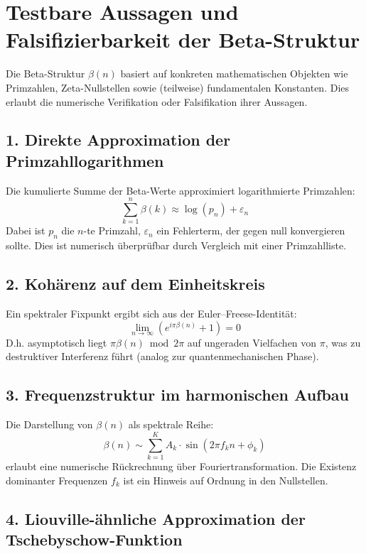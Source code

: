 \section{Testbare Aussagen und Falsifizierbarkeit der Beta-Struktur}

Die Beta-Struktur $\beta(n)$ basiert auf konkreten mathematischen Objekten wie Primzahlen, Zeta-Nullstellen sowie (teilweise) fundamentalen Konstanten. Dies erlaubt die numerische Verifikation oder Falsifikation ihrer Aussagen.

\subsection*{1. Direkte Approximation der Primzahllogarithmen}

Die kumulierte Summe der Beta-Werte approximiert logarithmierte Primzahlen:
\[
\sum_{k=1}^{n} \beta(k) \approx \log(p_n) + \varepsilon_n
\]
Dabei ist $p_n$ die $n$-te Primzahl, $\varepsilon_n$ ein Fehlerterm, der gegen null konvergieren sollte. Dies ist numerisch überprüfbar durch Vergleich mit einer Primzahlliste.

\subsection*{2. Kohärenz auf dem Einheitskreis}

Ein spektraler Fixpunkt ergibt sich aus der Euler–Freese-Identität:
\[
\lim_{n \to \infty} \left(e^{i \pi \beta(n)} + 1\right) = 0
\]
D.h. asymptotisch liegt $\pi \beta(n) \bmod 2\pi$ auf ungeraden Vielfachen von $\pi$, was zu destruktiver Interferenz führt (analog zur quantenmechanischen Phase).

\subsection*{3. Frequenzstruktur im harmonischen Aufbau}

Die Darstellung von $\beta(n)$ als spektrale Reihe:
\[
\beta(n) \sim \sum_{k=1}^K A_k \cdot \sin(2\pi f_k n + \phi_k)
\]
erlaubt eine numerische Rückrechnung über Fouriertransformation. Die Existenz dominanter Frequenzen $f_k$ ist ein Hinweis auf Ordnung in den Nullstellen.

\subsection*{4. Liouville-ähnliche Approximation der Tschebyschow-Funktion}

